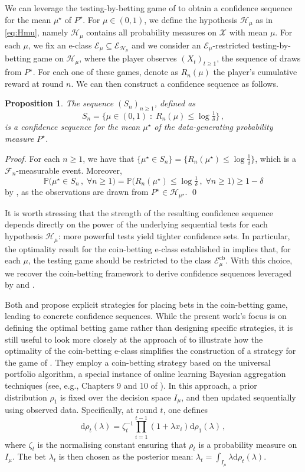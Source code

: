 \documentclass[3p, authoryear, 10pt]{elsarticle}%
\newcommand{\dd}{\mathrm{d}}
\newcommand{\Ecb}{\mathcal E^{\mathrm{cb}}}
\newcommand{\Ee}{\mathcal E}
\newcommand{\F}{\mathcal F}
\newcommand{\Hh}{\mathcal H}
\newcommand{\Pp}{\mathbb P}
\newcommand{\X}{\mathcal X}
\newtheorem{proposition}{Proposition}
\begin{document}
We can leverage the testing-by-betting game of  to obtain a confidence sequence for the mean $\mu^\star$ of $P^\star$. For  $\mu\in(0,1)$, we define the hypothesis $\Hh_\mu$ as in \eqref{eq:Hmu}, namely $\Hh_\mu$ contains all probability measures on $\X$ with mean $\mu$. For each $\mu$, we fix an e-class $\Ee_\mu\subseteq\Ee_{\Hh_\mu}$ and we consider an $\Ee_\mu$-restricted testing-by-betting game on $\Hh_\mu$, where the player observes $(X_t)_{t\geq 1}$, the sequence of draws from $P^\star$. For each one of these games, denote as $R_n(\mu)$ the player's cumulative reward at round $n$. We can then construct a confidence sequence as follows.
\begin{proposition}
    The sequence $(S_n)_{n\geq 1}$, defined as $$S_n = \big\{\mu\in(0,1)\;:\;R_n(\mu)\leq\log\tfrac{1}{\delta}\big\}\,,$$ is a confidence sequence for the mean $\mu^\star$ of the data-generating probability measure $P^\star$.
\end{proposition}
\begin{proof}
    For each $n\geq 1$, we have that $\{\mu^\star\in S_n\}=\{R_n(\mu^\star)\leq\log\frac{1}{\delta}\}$, which is a $\F_{n}$-measurable event. Moreover, $$\Pp\big(\mu^\star\in S_n\,,\;\forall n\geq1 \big) = \Pp\big(R_n(\mu^\star)\leq\log\tfrac{1}{\delta}\,,\;\forall n\geq1 \big)\geq1-\delta$$ by , as the observations are drawn from $P^\star\in\Hh_{\mu^\star}$. \qed
\end{proof}
It is worth stressing that the strength of the resulting confidence sequence depends directly on the power of the underlying sequential tests for each hypothesis $\Hh_\mu$: more powerful tests yield tighter confidence sets. In particular, the optimality result for the coin-betting e-class established in  implies that, for each $\mu$, the testing game should be restricted to the class $\Ecb_\mu$. With this choice, we recover the coin-betting framework to derive confidence sequences leveraged by \cite{orabona2023tight} and \cite{waudbysmith23estimating}. 

Both \citet{orabona2023tight} and \citet{waudbysmith23estimating} propose explicit strategies for placing bets in the coin-betting game, leading to concrete confidence sequences. While the present work's focus is on defining the optimal betting game rather than designing specific strategies, it is still useful to look more closely at the approach of \citet{orabona2023tight} to  illustrate how the optimality of the coin-betting e-class simplifies the construction of a strategy  for the game of . They employ a coin-betting strategy based on the universal portfolio algorithm, a special instance of online learning Bayesian aggregation techniques (see, e.g., Chapters 9 and 10 of \citealp{cesabianchi06prediction}). In this approach, a prior distribution $\rho_1$ is fixed over the decision space $I_\mu$, and then updated sequentially using observed data. Specifically, at round $t$, one defines $$\dd\rho_t(\lambda) = \zeta_t^{-1}\prod_{i=1}^{t-1}(1+\lambda x_i)\dd\rho_1(\lambda)\,,$$
where $\zeta_t$ is the normalising constant ensuring that $\rho_t$ is a  probability measure on $I_\mu$. The bet $\lambda_t$ is then chosen as the posterior mean: $\lambda_t = \int_{I_\mu} \lambda \dd\rho_t(\lambda)$.
\end{document}
